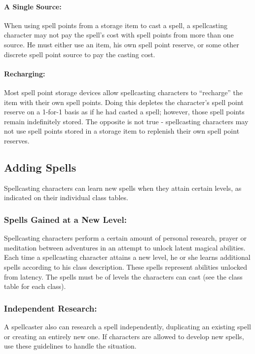 \documentclass[../VancianToPsionics.tex]{subfiles}
\begin{document}
\paragraph{A Single Source:} When using spell points from a storage item to cast a spell, a spellcasting character may not pay the spell's cost with spell points from more than one source. He must either use an item, his own spell point reserve, or some other discrete spell point source to pay the casting cost. 

\paragraph{Recharging:} Most spell point storage devices allow spellcasting characters to ``recharge'' the item with their own spell points. Doing this depletes the character's spell point reserve on a 1-for-1 basis as if he had casted a spell; however, those spell points remain indefinitely stored. The opposite is not true - spellcasting characters may not use spell points stored in a storage item to replenish their own spell point reserves.

\subsection{Adding Spells}
Spellcasting characters can learn new spells when they attain certain levels, as indicated on their individual class tables. %

\subsubsection{Spells Gained at a New Level:} Spellcasting characters perform a certain amount of personal research, prayer or meditation between adventures in an attempt to unlock latent magical abilities. Each time a spellcasting character attains a new level, he or she learns additional spells according to his class description. These spells represent abilities unlocked from latency. The spells must be of levels the characters can cast (see the class table for each class).

\subsubsection{Independent Research:} 
A spellcaster also can research a spell independently, duplicating an existing spell or creating an entirely new one. If characters are allowed to develop new spells, use these guidelines to handle the situation.
\end{document}
